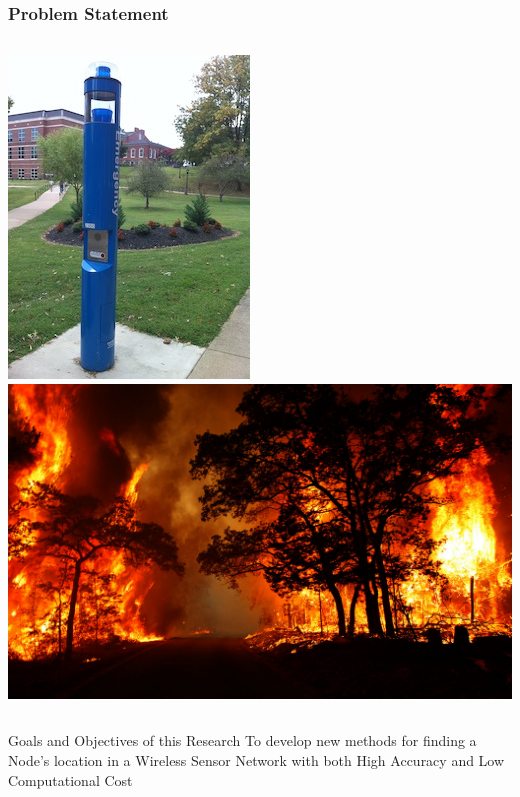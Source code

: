 \documentclass{beamer}
\begin{document}
\begin{frame}
\frametitle{Problem Statement}
\begin{columns}[c]
\includegraphics[width=.8\textwidth]{phone}
\includegraphics[width=\textwidth]{fire}
\end{columns}
\pause\begin{block}{Goals and Objectives of this Research}
{To develop new methods for finding a Node's location in a Wireless Sensor Network with both High Accuracy and Low Computational Cost}
\end{block}
\end{frame}
\end{document}
